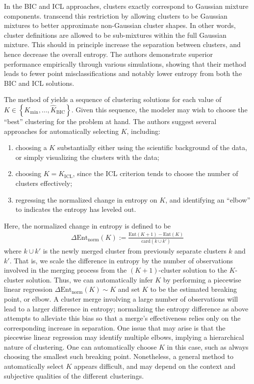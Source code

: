 \documentclass{uwstat572}
\newcommand*\ba{\[ \begin{aligned}}
\newcommand*\ea{\end{aligned} \]}
\newcommand*\set[1]{\left\{#1\right\}}
\newcommand*\estim[1]{\widehat{#1}}
\renewcommand\;{\,}
\begin{document}
In the BIC and ICL approaches, clusters exactly correspond to Gaussian mixture components.
\cite{Baudry10} transcend this restriction by allowing clusters to be Gaussian mixtures to better approximate non-Gaussian cluster shapes.
In other words, cluster definitions are allowed to be sub-mixtures within the full Gaussian mixture.
This should in principle increase the separation between clusters, and hence decrease the overall entropy.
The authors demonstrate superior performance empirically through various simulations, showing that their method leads to fewer point misclassifications and notably lower entropy from both the BIC and ICL solutions.

The method of \cite{Baudry10} yields a sequence of clustering solutions for each value of $K \in \set{K_\text{min}, \dotsc, \estim K_\text{BIC}}$.
Given this sequence, the modeler may wish to choose the ``best'' clustering for the problem at hand.
The authors suggest several approaches for automatically selecting $K$, including:
\begin{enumerate}
\item
choosing a $K$ substantially either using the scientific background of the data, or simply visualizing the clusters with the data;
\item
choosing $K = K_\text{ICL}$, since the ICL criterion tends to choose the number of clusters effectively;
\item
regressing the normalized change in entropy on $K$, and identifying an ``elbow'' to indicates the entropy has leveled out.
\end{enumerate}
Here, the normalized change in entropy is defined to be
\ba
\Delta\text{Ent}_\text{norm}(K)
	:= \frac{ \text{Ent}(K + 1) - \text{Ent}(K) }{ \text{card}\left(k \cup k'\right) } 
\ea
where $k\cup k'$ is the newly merged cluster from previously separate clusters $k$ and $k'$.
That is, we scale the difference in entropy by the number of observations involved in the merging process from the $(K+1)$-cluster solution to the $K$-cluster solution.
Thus, we can automatically infer $K$ by performing a piecewise linear regression $\Delta \text{Ent}_\text{norm}(K) \sim K$ and set $K$ to be the estimated breaking point, or elbow.
A cluster merge involving a large number of observations will lead to a larger difference in entropy; normalizing the entropy difference as above attempts to alleviate this bias so that a merge's effectiveness relies only on the corresponding increase in separation.
One issue that may arise is that the piecewise linear regression may identify multiple elbows, implying a hierarchical nature of clustering.
One can automatically choose $K$ in this case, such as always choosing the smallest such breaking point.
Nonetheless, a general method to automatically select $K$ appears difficult, and may depend on the context and subjective qualities of the different clusterings.
\end{document}
